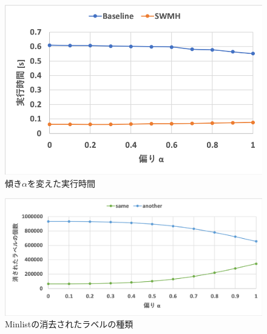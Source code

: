 

 \begin{figure}[h]
  \centering
  \includegraphics[width=14cm]{katamuki.png}
    \caption{傾き$\alpha$を変えた実行時間}
    \label{fig:jikken2}
\end{figure}
  
  \begin{figure}[h]
  \centering
  \includegraphics[width=14cm]{same_another.png}
    \caption{Minlistの消去されたラベルの種類}
    \label{fig:same_another}
\end{figure}


